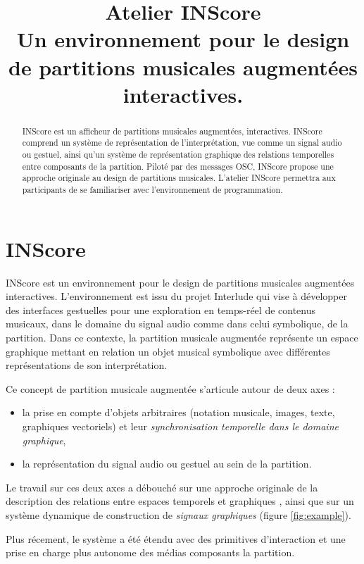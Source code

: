 \documentclass{article}
\title{Atelier INScore \\
\textmd{{\small Un environnement pour le design de partitions musicales augmentées interactives.}}
}
\begin{document}
%
\maketitle
%
\begin{abstract}
INScore est un afficheur de partitions musicales augmentées, interactives. INScore comprend un système de représentation de l'interprétation, vue comme un signal audio ou gestuel, ainsi qu'un système de représentation graphique des relations temporelles entre composants de la partition. Piloté par des messages OSC, INScore propose une approche originale au design de partitions musicales. L'atelier INScore permettra aux participants de se familiariser avec l'environnement de programmation. 
\end{abstract}

\section{INScore}

INScore est un environnement pour le design de partitions musicales augmentées interactives. L'environnement est issu du projet Interlude qui vise à développer des interfaces gestuelles pour une exploration en temps-réel de contenus musicaux, dans le domaine du signal audio comme dans celui symbolique, de la partition. Dans ce contexte, la partition musicale augmentée représente un espace graphique mettant en relation un objet musical symbolique avec différentes représentations de son interprétation.

Ce concept de partition musicale augmentée s'articule autour de deux axes :
\begin{itemize}
\item la prise en compte d'objets arbitraires (notation musicale, images, texte, graphiques vectoriels) et leur \textit{synchronisation temporelle dans le domaine graphique},
\item la représentation du signal audio ou gestuel au sein de la partition.
\end{itemize}

Le travail sur ces deux axes a débouché sur une approche originale de la description des relations entre espaces temporels et graphiques \cite{fober:10b}, ainsi que sur un système dynamique de construction de \textit{signaux graphiques} \cite{fober:10a,Fober:10c} (figure \ref{fig:example}).

Plus récement, le système a été étendu avec des primitives d'interaction et une prise en charge plus autonome des médias composants la partition.
\end{document}

